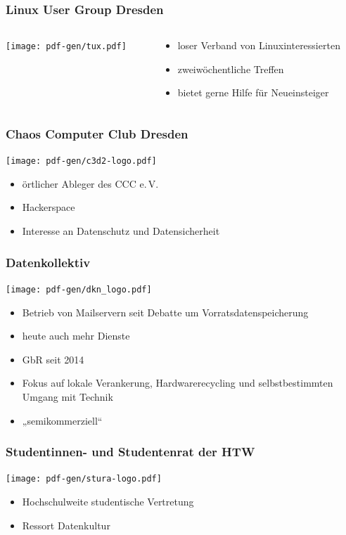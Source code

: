 \documentclass[t]{beamer}
\begin{document}
\begin{frame}
  \frametitle{Linux User Group Dresden}
  \begin{columns}
    \begin{column}[T]{0.45\textwidth}
      \texttt{[image: pdf-gen/tux.pdf]}
    \end{column}
    \begin{column}{0.45\textwidth}
      \begin{itemize}
      \item loser Verband von Linuxinteressierten
      \item zweiwöchentliche Treffen
      \item bietet gerne Hilfe für Neueinsteiger
      \end{itemize}
    \end{column}
  \end{columns}
\end{frame}

\begin{frame}
  \frametitle{Chaos Computer Club Dresden}
  \begin{center}
    \texttt{[image: pdf-gen/c3d2-logo.pdf]}
  \end{center}
  \begin{itemize}
  \item örtlicher Ableger des CCC e.\,V.
  \item Hackerspace
  \item Interesse an Datenschutz und Datensicherheit
  \end{itemize}
\end{frame}

\begin{frame}
  \frametitle{Datenkollektiv}
  \texttt{[image: pdf-gen/dkn\_logo.pdf]}
  \vspace*{-1em}
  \begin{itemize}
  \item Betrieb von Mailservern seit Debatte um Vorratsdatenspeicherung
  \item heute auch mehr Dienste
  \item GbR seit 2014
  \item Fokus auf lokale Verankerung, Hardwarerecycling und selbstbestimmten Umgang mit Technik
  \item „semikommerziell“
  \end{itemize}
\end{frame}

\begin{frame}
  \frametitle{Studentinnen- und Studentenrat der HTW}
  \begin{center}
    \texttt{[image: pdf-gen/stura-logo.pdf]}
  \end{center}
  \begin{itemize}
  \item Hochschulweite studentische Vertretung
  \item Ressort Datenkultur
  \end{itemize}
\end{frame}
\end{document}
